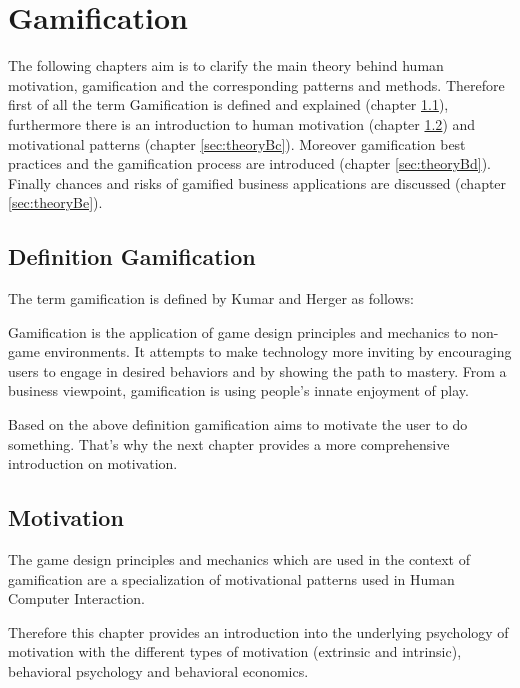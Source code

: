 \newpage
\section{Gamification}
\label{sec:theoryB}

The following chapters aim is to clarify the main theory behind human motivation, gamification and the corresponding patterns and methods. Therefore first of all the term Gamification is defined and explained (chapter \ref{sec:theoryBa}), furthermore there is an introduction to human motivation (chapter \ref{sec:theoryBb}) and motivational patterns (chapter \ref{sec:theoryBc}). Moreover gamification best practices and the gamification process are introduced (chapter \ref{sec:theoryBd}). Finally chances and risks of gamified business applications are discussed (chapter \ref{sec:theoryBe}).


\subsection{Definition Gamification}
\label{sec:theoryBa}

The term gamification is defined by Kumar and Herger as follows:

\begin{fquote}
	Gamification is the application of game design principles and mechanics to
	non-game environments. It attempts to make technology more inviting by encouraging users to engage in desired behaviors and by showing the path to mastery.
	From a business viewpoint, gamification is using people’s innate enjoyment of play.
\end{fquote}

Based on the above definition gamification aims to motivate the user to do something. That's why the next chapter provides a more comprehensive introduction on motivation. \cite[p. 8]{inproceedings}


\subsection{Motivation}
\label{sec:theoryBb}

The game design principles and mechanics which are used in the context of gamification are a specialization of motivational patterns used in Human Computer Interaction. \cite[p. 59]{inproceedings}

Therefore this chapter provides an introduction into the underlying psychology of motivation with the different types of motivation (extrinsic and intrinsic), behavioral psychology and behavioral economics.

